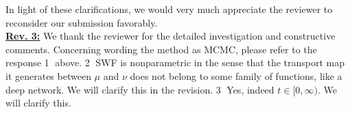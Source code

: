 \documentclass{article}
\newcommand{\rev}[1]{{\color{red} #1}}
\newcommand{\umut}[1]{{\color{blue} #1}}
\newcommand{\ubul}[1]{{\large \color{red} \textcircled{\small #1}}}
\begin{document}
\vspace{-5pt}In light of these clarifications, we would very much appreciate the reviewer to reconsider our submission favorably.\\
%
%
\textbf{\color{red} \underline{Rev. 3:}}
%
We thank the reviewer for the detailed investigation and constructive comments. %
%
%
%
%
Concerning wording the method as MCMC, please refer to the response \ubul{1} above.
\ubul{2} SWF is nonparametric in the sense that the transport map it generates between $\mu$ and $\nu$ does not belong to some family of functions, like a deep network.
We will clarify this in the revision.
%
%
\ubul{3} Yes, indeed $t \in [0, \infty)$. We will clarify this.
%
\end{document}
